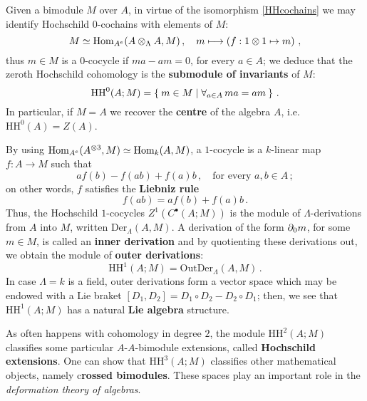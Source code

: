 	\begin{rmk}
		Given a bimodule $M$ over $A$, 
		in virtue of the isomorphism \eqref{HHcochains} we may identify
		Hochschild $0$-cochains with elements of $M$:
		\begin{equation*}
			M \simeq \operatorname{Hom}_{A^{e}}(A \otimes_{\Lambda} A, M)\,,
			\quad m \longmapsto \left( f : 1 \otimes 1 \mapsto m \right)\,,
		\end{equation*}
		thus $m \in M$ is a $0$-cocycle if $ma - am=0$, for every $a \in A$;
		we deduce that the zeroth Hochschild cohomology is the
		\textbf{submodule of invariants} of $M$:
		\begin{equation*}
			\mathrm{HH}^{0}(A;M) = \Set{m \in M | \forall_{a \in A}\, ma=am}\,.
		\end{equation*}
		In particular, if $M=A$ we recover the \textbf{centre} of the algebra $A$,
		i.e. $\mathrm{HH}^{0}(A) = Z(A)$.
		
		By using $\operatorname{Hom}_{A^{e}}(A^{\otimes 3},M) \simeq \operatorname{Hom}_{k}(A,M)$,
		a $1$-cocycle is a $k$-linear map $f:A \to M$ such that
		\begin{equation*}
			af(b) - f(ab) + f(a)b\,, \quad \text{for every } a,b \in A\,;
		\end{equation*}
		on other words, $f$ satisfies the \textbf{Liebniz rule}
		\begin{equation*}
			f(ab) = af(b) + f(a)b\,.
		\end{equation*}
		Thus, the Hochschild $1$-cocycles $Z^{1}(C^{\bullet}(A;M))$ 
		is the module of $\Lambda$-derivations from $A$ into $M$,
		written $\mathrm{Der}_{\Lambda}(A,M)$. 
		A derivation of the form $\partial_{0}m$, for some $m \in M$,
		is called an \textbf{inner derivation} and by quotienting these
		derivations out, we obtain the module of \textbf{outer derivations}:
		\begin{equation*}
			\mathrm{HH}^1(A;M) = \mathrm{OutDer}_{\Lambda}(A,M)\,.
		\end{equation*}
		In case $\Lambda = k$ is a field, outer derivations form a vector
		space which may be endowed with a Lie braket 
		$[D_{1},D_{2}]=D_{1} \circ D_{2} - D_{2} \circ D_{1}$;
		then, we see that $\mathrm{HH}^{1}(A;M)$ has a natural
		\textbf{Lie algebra} structure.
		
		As often happens with cohomology in degree $2$, the module
		$\mathrm{HH}^{2}(A;M)$ classifies some particular $A$-$A$-bimodule
		extensions, called \textbf{Hochschild extensions}.
		One can show that $\mathrm{HH}^{3}(A;M)$ classifies 
		other mathematical objects, namely c\textbf{rossed bimodules}.
		These spaces  play an important role in the \emph{deformation theory of algebras}.
	\end{rmk}
	
	